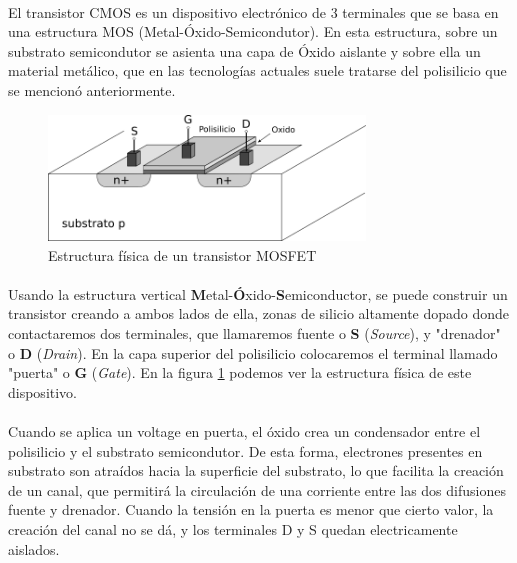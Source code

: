 \paragraph{}
El transistor CMOS es un dispositivo electrónico de 3 terminales que se basa
en una estructura MOS (Metal-Óxido-Semicondutor). En esta estructura, sobre un
substrato semicondutor se asienta una capa de Óxido aislante y sobre ella un
material metálico, que en las tecnologías actuales suele tratarse del polisilicio
que se mencionó anteriormente.

\begin{figure}[h]
	\centering
	\includegraphics[width=0.75\textwidth]{img/mosfet.png}
	\caption{Estructura física de un transistor MOSFET}
	\label{fig:mosfet}
\end{figure}

\paragraph{}
Usando la estructura vertical \textbf{M}etal-\textbf{Ó}xido-\textbf{S}emiconductor,
se puede construir un transistor creando a ambos lados de ella, zonas de silicio
altamente dopado donde contactaremos dos terminales, que llamaremos fuente o \textbf{S}
(\textit{Source}), y "drenador" o \textbf{D} (\textit{Drain}). En la capa superior
del polisilicio colocaremos el terminal llamado "puerta" o \textbf{G} (\textit{Gate}).
En la figura \ref{fig:mosfet} podemos ver la estructura física de este dispositivo.

\paragraph{}
Cuando se aplica un voltage en puerta, el óxido crea un
condensador entre el polisilicio y el substrato semicondutor. De esta forma,
electrones presentes en substrato son atraídos hacia la superficie del substrato,
lo que facilita la creación de un canal, que permitirá la circulación de una
corriente entre las dos difusiones fuente y drenador. Cuando la tensión en la puerta
es menor que cierto valor, la creación del canal no se dá, y los terminales D y S
quedan electricamente aislados.

